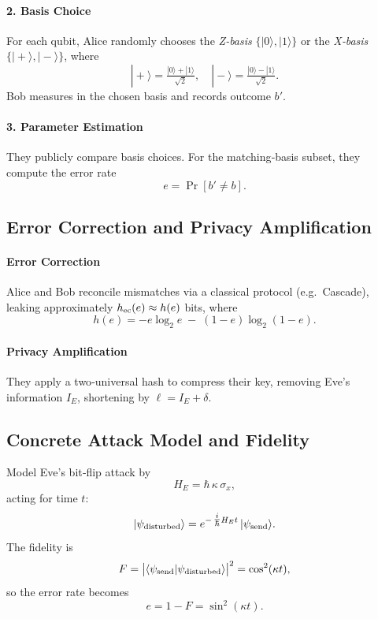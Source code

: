 \paragraph{2. Basis Choice}  
For each qubit, Alice randomly chooses the \emph{Z‐basis}
\(\{|0\rangle,|1\rangle\}\) or the \emph{X‐basis}
\(\{|\!+\!\rangle,|\!-\!\rangle\}\), where
\begin{equation}\label{eq:x_basis}
|\!+\!\rangle = \tfrac{|0\rangle+|1\rangle}{\sqrt2},\quad
|\!-\!\rangle = \tfrac{|0\rangle-|1\rangle}{\sqrt2}.
\end{equation}
Bob measures in the chosen basis and records outcome \(b'\).

\paragraph{3. Parameter Estimation}  
They publicly compare basis choices.  For the matching‐basis subset, they compute the error rate
\begin{equation}\label{eq:error_rate}
e = \Pr[b'\neq b].
\end{equation}

\subsection{Error Correction and Privacy Amplification}

\paragraph{Error Correction}  
Alice and Bob reconcile mismatches via a classical protocol (e.g.\ Cascade), leaking approximately \(h_{\rm ec}(e)\approx h(e)\) bits, where
\begin{equation}
h(e) = -e\log_2 e \;-\;(1-e)\log_2(1-e).
\end{equation}

\paragraph{Privacy Amplification}  
They apply a two‐universal hash to compress their key, removing Eve’s information \(I_E\), shortening by \(\ell = I_E + \delta\).

\subsection{Concrete Attack Model and Fidelity}

Model Eve’s bit‐flip attack by
\[
H_E = \hbar\,\kappa\,\sigma_x,
\]
acting for time \(t\):
\[
|\psi_{\rm disturbed}\rangle
= e^{-\,\tfrac{i}{\hbar}H_E t}\,|\psi_{\rm send}\rangle.
\]
The fidelity is
\begin{equation}\label{eq:fidelity_attack}
F = \bigl|\langle\psi_{\rm send}|\psi_{\rm disturbed}\rangle\bigr|^2
= \cos^2(\kappa t),
\end{equation}
so the error rate becomes
\begin{equation}\label{eq:error_attack}
e = 1 - F = \sin^2(\kappa t).
\end{equation}

